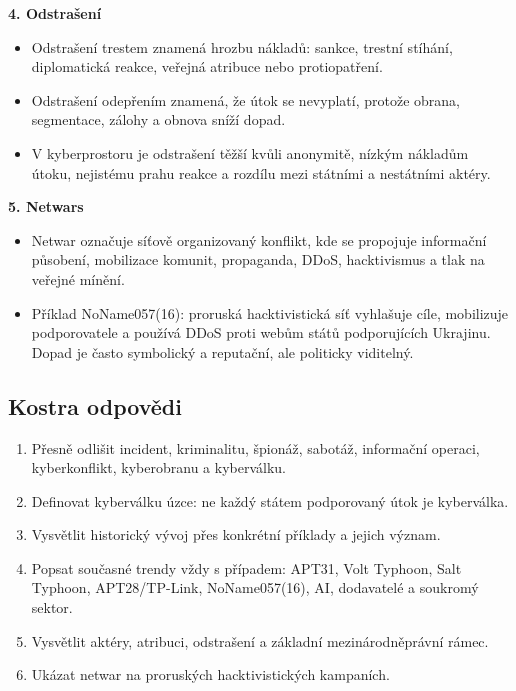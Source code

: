 \textbf{4. Odstrašení}
\begin{itemize}
  \item Odstrašení trestem znamená hrozbu nákladů: sankce, trestní stíhání, diplomatická reakce, veřejná atribuce nebo protiopatření.
  \item Odstrašení odepřením znamená, že útok se nevyplatí, protože obrana, segmentace, zálohy a obnova sníží dopad.
  \item V kyberprostoru je odstrašení těžší kvůli anonymitě, nízkým nákladům útoku, nejistému prahu reakce a rozdílu mezi státními a nestátními aktéry.
\end{itemize}

\textbf{5. Netwars}
\begin{itemize}
  \item Netwar označuje síťově organizovaný konflikt, kde se propojuje informační působení, mobilizace komunit, propaganda, DDoS, hacktivismus a tlak na veřejné mínění.
  \item Příklad NoName057(16): proruská hacktivistická síť vyhlašuje cíle, mobilizuje podporovatele a používá DDoS proti webům států podporujících Ukrajinu. Dopad je často symbolický a reputační, ale politicky viditelný.
\end{itemize}

\subsection*{Kostra odpovědi}
\begin{enumerate}
  \item Přesně odlišit incident, kriminalitu, špionáž, sabotáž, informační operaci, kyberkonflikt, kyberobranu a kyberválku.
  \item Definovat kyberválku úzce: ne každý státem podporovaný útok je kyberválka.
  \item Vysvětlit historický vývoj přes konkrétní příklady a jejich význam.
  \item Popsat současné trendy vždy s případem: APT31, Volt Typhoon, Salt Typhoon, APT28/TP-Link, NoName057(16), AI, dodavatelé a soukromý sektor.
  \item Vysvětlit aktéry, atribuci, odstrašení a základní mezinárodněprávní rámec.
  \item Ukázat netwar na proruských hacktivistických kampaních.
\end{enumerate}

